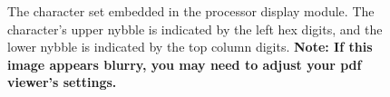 \documentclass[../../ProjectDocumentation.tex]{subfiles}
\begin{document}
\begin{figure}
\begin{tt}
\end{tt}

\caption{The character set embedded in the processor display module. The character's upper nybble is indicated by the left hex digits, and the lower nybble is indicated by the top column digits. \textbf{Note: If this image appears blurry, you may need to adjust your pdf viewer's settings.} }
\label{fig:charset}

\end{figure}
\end{document}
